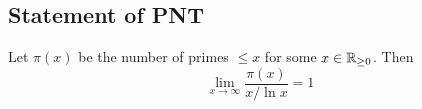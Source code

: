 \documentclass[12pt]{article}
\begin{document}
\subsection{Statement of PNT}
\begin{theorem}
    Let $\pi(x)$ be the number of primes $\leq x$ for some $x\in \mathbb{R}_{\geq 0}$. Then \[\lim_{x\to \infty}\frac{\pi(x)}{x/\ln x}=1\]
\end{theorem}
\[\]
\[\]
\[\]
\end{document}
